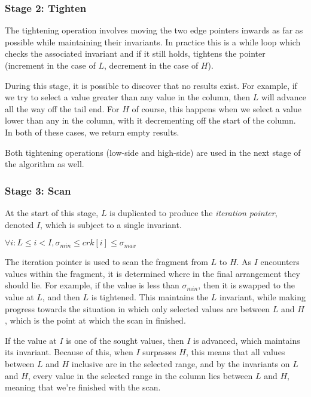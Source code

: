 \subsubsection{Stage 2: Tighten}

The tightening operation involves moving the two edge pointers inwards as far as possible while maintaining their invariants. In practice this is a while loop which checks the associated invariant and if it still holds, tightens the pointer (increment in the case of $L$, decrement in the case of $H$).

During this stage, it is possible to discover that no results exist. For example, if we try to select a value greater than any value in the column, then $L$ will advance all the way off the tail end. For $H$ of course, this happens when we select a value lower than any in the column, with it decrementing off the start of the column. In both of these cases, we return empty results.

Both tightening operations (low-side and high-side) are used in the next stage of the algorithm as well.

\subsubsection{Stage 3: Scan}

At the start of this stage, $L$ is duplicated to produce the \textit{iteration pointer}, denoted $I$, which is subject to a single invariant.

\begin{tcolorbox}
$\forall i: L \leq i < I, \sigma _{min} \leq crk[i] \leq \sigma _{max}$
\end{tcolorbox}

The iteration pointer is used to scan the fragment from $L$ to $H$. As $I$ encounters values within the fragment, it is determined where in the final arrangement they should lie. For example, if the value is less than $\sigma _{min}$, then it is swapped to the value at $L$, and then $L$ is tightened. This maintains the $L$ invariant, while making progress towards the situation in which only selected values are between $L$ and $H$, which is the point at which the scan in finished.

If the value at $I$ is one of the sought values, then $I$ is advanced, which maintains its invariant. Because of this, when $I$ surpasses $H$, this means that all values between $L$ and $H$ inclusive are in the selected range, and by the invariants on $L$ and $H$, every value in the selected range in the column lies between $L$ and $H$, meaning that we're finished with the scan.

